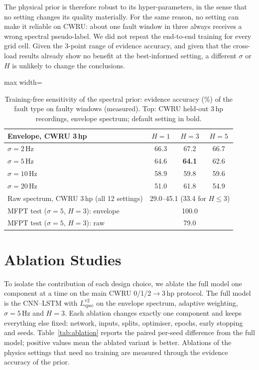 \documentclass[conference]{IEEEtran}
\newcommand{\Lspec}{L_{\mathrm{spec}}}
\begin{document}
The physical prior is therefore robust to its hyper-parameters, in the sense
that no setting changes its quality materially. For the same reason, no
setting can make it reliable on CWRU: about one fault window in three always
receives a wrong spectral pseudo-label. We did not repeat the end-to-end
training for every grid cell. Given the 3-point range of evidence accuracy, and
given that the cross-load results already show no benefit at the best-informed
setting, a different $\sigma$ or $H$ is unlikely to change the conclusions.

\begin{table}[t]
\caption{Training-free sensitivity of the spectral prior: evidence accuracy
(\%) of the fault type on faulty windows (measured). Top: CWRU held-out
3\,hp recordings, envelope spectrum; default setting in bold.}
\label{tab:sens}
\centering
\footnotesize
\begin{adjustbox}{max width=\columnwidth}
\begin{tabular}{lccc}
\toprule
Envelope, CWRU 3\,hp & $H=1$ & $H=3$ & $H=5$ \\
\midrule
$\sigma=2$\,Hz  & 66.3 & 67.2 & 66.7 \\
$\sigma=5$\,Hz  & 64.6 & \textbf{64.1} & 62.6 \\
$\sigma=10$\,Hz & 58.9 & 59.8 & 59.6 \\
$\sigma=20$\,Hz & 51.0 & 61.8 & 54.9 \\
\midrule
Raw spectrum, CWRU 3\,hp (all 12 settings) & \multicolumn{3}{c}{29.0--45.1 (33.4 for $H\le3$)} \\
\midrule
MFPT test ($\sigma=5$, $H=3$): envelope & \multicolumn{3}{c}{100.0} \\
MFPT test ($\sigma=5$, $H=3$): raw & \multicolumn{3}{c}{79.0} \\
\bottomrule
\end{tabular}
\end{adjustbox}
\end{table}

\section{Ablation Studies}
\label{sec:ablation}
To isolate the contribution of each design choice, we ablate the full model
one component at a time on the main CWRU 0/1/2$\to$3\,hp protocol. The full
model is the CNN--LSTM with $\Lspec^{\mathrm{v2}}$ on the envelope spectrum,
adaptive weighting, $\sigma=5$\,Hz and $H=3$. Each ablation changes exactly
one component and keeps everything else fixed: network, inputs, splits,
optimiser, epochs, early stopping and seeds. Table~\ref{tab:ablation} reports
the paired per-seed difference from the full model; positive values mean the
ablated variant is better. Ablations of the physics settings that need no
training are measured through the evidence accuracy of the prior.
\end{document}
